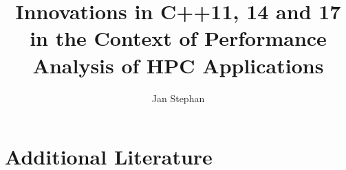 \documentclass[utf8,hauptseminar]{zihpub}
\author{Jan Stephan}
\title{Innovations in C++11, 14 and 17 in the Context of Performance Analysis of HPC Applications}
\begin{document}






\section{Additional Literature}
{}

\end{document}
